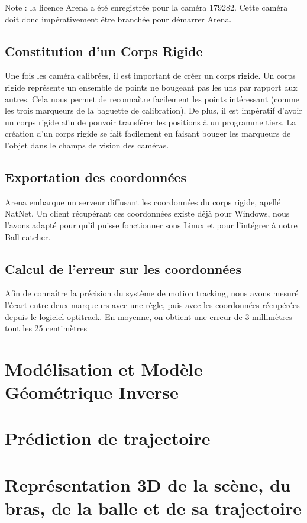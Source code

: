 \documentclass{article}[11pt]
\begin{document}
Note : la licence Arena a été enregistrée pour la caméra 179282. Cette caméra doit donc impérativement être branchée pour démarrer Arena.

\subsection{Constitution d'un Corps Rigide}

Une fois les caméra calibrées, il est important de créer un corps rigide.
Un corps rigide représente un ensemble de points ne bougeant pas les uns par rapport aux autres. Cela nous permet de reconnaître facilement les points intéressant (comme les trois marqueurs de la baguette de calibration). De plus, il est impératif d'avoir un corps rigide afin de pouvoir transférer les positions à un programme tiers. La création d'un corps rigide se fait facilement en faisant bouger les marqueurs de l'objet dans le champs de vision des caméras.

\subsection{Exportation des coordonnées}

Arena embarque un serveur diffusant les coordonnées du corps rigide, apellé NatNet. Un client récupérant ces coordonnées existe déjà pour Windows, nous l'avons adapté pour qu'il puisse fonctionner sous Linux et pour l'intégrer à notre Ball catcher. 

\subsection{Calcul de l'erreur sur les coordonnées}
Afin de connaître la précision du système de motion tracking, nous avons mesuré l'écart entre deux marqueurs avec une règle, puis avec les coordonnées récupérées depuis le logiciel optitrack. En moyenne, on obtient une erreur de 3 millimètres tout les 25 centimètres 
\newpage
\section{Modélisation et Modèle Géométrique Inverse}


\section{Prédiction de trajectoire}


\section{Représentation 3D de la scène, du bras, de la balle et de sa trajectoire}
\end{document}
